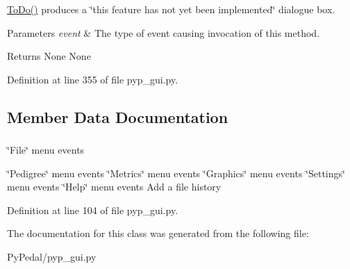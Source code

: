 \hyperlink{classPyPedal_1_1pyp__gui_1_1MainWindow_a4b5adafe34e9923eac05fb61bf1494f2}{ToDo()} produces a \char`\"{}this feature has not yet been implemented\char`\"{} dialogue box. 


\begin{DoxyParams}{Parameters}
{\em event} & The type of event causing invocation of this method. \\
\hline
\end{DoxyParams}
\begin{DoxyReturn}{Returns}
None  None 
\end{DoxyReturn}


Definition at line 355 of file pyp\_\-gui.py.



\subsection{Member Data Documentation}
\hypertarget{classPyPedal_1_1pyp__gui_1_1MainWindow_aa6e260ac28d62643a4ad89b5b85920a1}{
\subsubsection[{filehistory}]{}}
\label{classPyPedal_1_1pyp__gui_1_1MainWindow_aa6e260ac28d62643a4ad89b5b85920a1}


\char`\"{}File\char`\"{} menu events 

\char`\"{}Pedigree\char`\"{} menu events \char`\"{}Metrics\char`\"{} menu events \char`\"{}Graphics\char`\"{} menu events \char`\"{}Settings\char`\"{} menu events \char`\"{}Help\char`\"{} menu events Add a file history 

Definition at line 104 of file pyp\_\-gui.py.



The documentation for this class was generated from the following file:\begin{DoxyCompactItemize}
\item 
PyPedal/pyp\_\-gui.py\end{DoxyCompactItemize}
